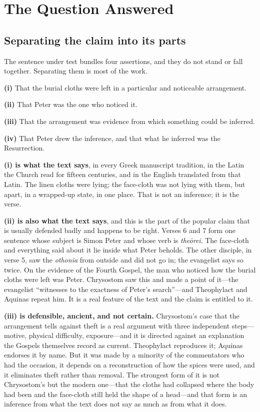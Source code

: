 \section{The Question Answered}

\subsection{Separating the claim into its parts}

The sentence under test bundles four assertions, and they do not stand or fall
together. Separating them is most of the work.

\begin{studyframe}\small
\textbf{(i)} That the burial cloths were left in a particular and noticeable
arrangement.

\textbf{(ii)} That Peter was the one who noticed it.

\textbf{(iii)} That the arrangement was evidence from which something could be
inferred.

\textbf{(iv)} That Peter drew the inference, and that what he inferred was the
Resurrection.
\end{studyframe}

\textbf{(i) is what the text says}, in every Greek manuscript tradition, in the
Latin the Church read for fifteen centuries, and in the English translated from
that Latin. The linen cloths were lying; the face-cloth was not lying with
them, but apart, in a wrapped-up state, in one place. That is not an inference;
it is the verse.

\textbf{(ii) is also what the text says}, and this is the part of the popular
claim that is usually defended badly and happens to be right. Verses 6 and 7
form one sentence whose subject is Simon Peter and whose verb is
\emph{the\=orei}. The face-cloth and everything said about it lie inside what
Peter beholds. The other disciple, in verse 5, saw the \emph{othonia} from
outside and did not go in; the evangelist says so twice. On the evidence of the
Fourth Gospel, the man who noticed how the burial cloths were left was Peter.
Chrysostom saw this and made a point of it---the evangelist ``witnesses to the
exactness of Peter's search''---and Theophylact and Aquinas repeat him. It is a
real feature of the text and the claim is entitled to it.

\textbf{(iii) is defensible, ancient, and not certain.} Chrysostom's case that
the arrangement tells against theft is a real argument with three independent
steps---motive, physical difficulty, exposure---and it is directed against an
explanation the Gospels themselves record as current. Theophylact reproduces it;
Aquinas endorses it by name. But it was made by a minority of the commentators
who had the occasion, it depends on a reconstruction of how the spices were
used, and it eliminates theft rather than removal. The strongest form of it is
not Chrysostom's but the modern one---that the cloths had collapsed where the
body had been and the face-cloth still held the shape of a head---and that form
is an inference from what the text does not say as much as from what it does.

